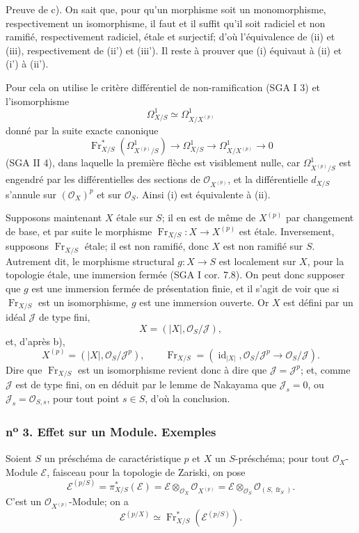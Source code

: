 \documentclass[11pt]{article}
\providecommand{\OO}{\mathcal{O}}
\providecommand{\id}{\operatorname{id}}
\providecommand{\cE}{\mathcal E}
\providecommand{\id}{\operatorname{id}}
\providecommand{\id}{\operatorname{id}}
\providecommand{\id}{\operatorname{id}}
\providecommand{\id}{\operatorname{id}}
\providecommand{\fr}{\operatorname{fr}}
\providecommand{\Fr}{\operatorname{Fr}}
\providecommand{\JJ}{\mathcal J}
\begin{document}
Preuve de c). On sait que, pour qu'un morphisme soit un monomorphisme, respectivement un isomorphisme, il faut et il suffit qu'il soit radiciel et non ramifié, respectivement radiciel, étale et surjectif; d'où l'équivalence de (ii) et (iii), respectivement de (ii') et (iii'). Il reste à prouver que (i) équivaut à (ii) et (i') à (ii').

Pour cela on utilise le critère différentiel de non-ramification (SGA I 3) et l'isomorphisme
\[
\Omega^1_{X/S}\simeq \Omega^1_{X/X^{(p)}}
\]
donné par la suite exacte canonique
\[
\Fr_{X/S}^*(\Omega^1_{X^{(p)}/S})\longrightarrow \Omega^1_{X/S}
\longrightarrow \Omega^1_{X/X^{(p)}}\longrightarrow 0
\]
(SGA II 4), dans laquelle la première flèche est visiblement nulle, car $\Omega^1_{X^{(p)}/S}$ est engendré par les différentielles des sections de $\OO_{X^{(p)}}$, et la différentielle $d_{X/S}$ s'annule sur $(\OO_X)^p$ et sur $\OO_S$. Ainsi (i) est équivalente à (ii).

Supposons maintenant $X$ étale sur $S$; il en est de même de $X^{(p)}$ par changement de base, et par suite le morphisme $\Fr_{X/S}:X\to X^{(p)}$ est étale. Inversement, supposons $\Fr_{X/S}$ étale; il est non ramifié, donc $X$ est non ramifié sur $S$. Autrement dit, le morphisme structural $g:X\to S$ est localement sur $X$, pour la topologie étale, une immersion fermée (SGA I cor. 7.8). On peut donc supposer que $g$ est une immersion fermée de présentation finie, et il s'agit de voir que si $\Fr_{X/S}$ est un isomorphisme, $g$ est une immersion ouverte. Or $X$ est défini par un idéal $\JJ$ de type fini,
\[
X=(|X|,\OO_S/\JJ),
\]
et, d'après b),
\[
X^{(p)}=(|X|,\OO_S/\JJ^p),
\qquad
\Fr_{X/S}=(\id_{|X|},\OO_S/\JJ^p\to\OO_S/\JJ).
\]
Dire que $\Fr_{X/S}$ est un isomorphisme revient donc à dire que $\JJ=\JJ^p$; et, comme $\JJ$ est de type fini, on en déduit par le lemme de Nakayama que $\JJ_s=0$, ou $\JJ_s=\OO_{S,s}$, pour tout point $s\in S$, d'où la conclusion.

\subsubsection*{n\textsuperscript{o} 3. Effet sur un Module. Exemples}

Soient $S$ un préschéma de caractéristique $p$ et $X$ un $S$-préschéma; pour tout $\OO_X$-Module $\cE$, faisceau pour la topologie de Zariski, on pose
\[
\cE^{(p/S)}=\pi_{X/S}^*(\cE)=\cE\otimes_{\OO_X}\OO_{X^{(p)}}
 =\cE\otimes_{\OO_S}\OO_{(S,\fr_S)}.
\]
C'est un $\OO_{X^{(p)}}$-Module; on a
\[
\cE^{(p/X)}\simeq \Fr_{X/S}^*(\cE^{(p/S)}).
\]
\end{document}
